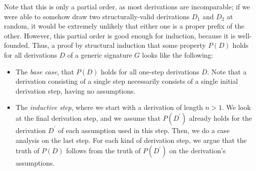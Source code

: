 \documentclass[../generics]{subfiles}
\begin{document}
Note that this is only a partial order, as most derivations are incomparable; if we were able to somehow draw two structurally-valid derivations $D_1$ and $D_2$ at random, it would be extremely unlikely that either one is a proper prefix of the other. However, this partial order is good enough for induction, because it is well-founded. Thus, a proof by structural induction that some property $P(D)$ holds for all derivations $D$ of a generic signature $G$ looks like the following:
\begin{itemize}
\item The \emph{base case}, that $P(D)$ holds for all one-step derivations $D$. Note that a derivation consisting of a single step necessarily consists of a single initial derivation step, having no assumptions.
\item The \emph{inductive step}, where we start with a derivation of length $n>1$. We look at the final derivation step, and we assume that $P(D^\prime)$ already holds for the derivation $D^\prime$ of each assumption used in this step. Then, we do a case analysis on the last step. For each kind of derivation step, we argue that the truth of $P(D)$ follows from the truth of $P(D^\prime)$ on the derivation's assumptions.
\end{itemize}
\end{document}
